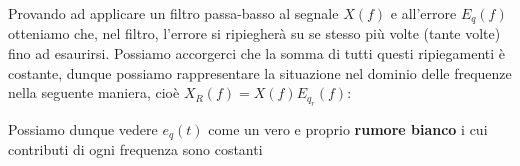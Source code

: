 Provando ad applicare un filtro passa-basso al segnale $X(f)$ e all'errore $E_q(f)$ otteniamo che, nel filtro, l'errore si ripiegherà 
su se stesso più volte (tante volte) fino ad esaurirsi. Possiamo accorgerci che la somma di tutti questi ripiegamenti è costante, dunque
possiamo rappresentare la situazione nel dominio delle frequenze nella seguente maniera, cioè $X_R(f) = X(f)E_{q_r}(f)$:\\

Possiamo dunque vedere $e_q(t)$ come un vero e proprio \textbf{rumore bianco} i cui contributi di ogni frequenza sono costanti